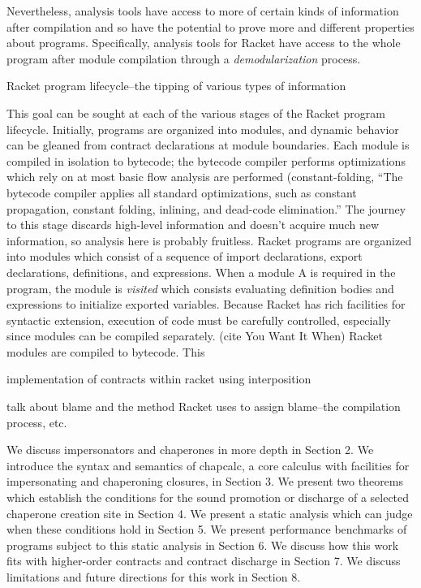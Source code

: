 \documentclass{sigplanconf}
\begin{document}
Nevertheless, analysis tools have access to more of certain kinds of information after compilation and so have the potential to prove more and different properties about programs.
Specifically, analysis tools for Racket have access to the whole program after module compilation through a \emph{demodularization} process.

Racket program lifecycle--the tipping of various types of information


This goal can be sought at each of the various stages of the Racket program lifecycle.
Initially, programs are organized into modules, and dynamic behavior can be gleaned from contract declarations at module boundaries.\cite{tobin2012higher}
Each module is compiled in isolation to bytecode; the bytecode compiler performs optimizations which rely on at most basic flow analysis are performed (constant-folding, 
``The bytecode compiler applies all standard optimizations, such as constant propagation, constant folding, inlining, and dead-code elimination.''
The journey to this stage discards high-level information and doesn't acquire much new information, so analysis here is probably fruitless.
Racket programs are organized into modules which consist of a sequence of import declarations, export declarations, definitions, and expressions.
When a module A is required in the program, the module is \emph{visited} which consists evaluating definition bodies and expressions to initialize exported variables.
Because Racket has rich facilities for syntactic extension, execution of code must be carefully controlled, especially since modules can be compiled separately.
(cite You Want It When)
Racket modules are compiled to bytecode. This

implementation of contracts within racket using interposition

talk about blame and the method Racket uses to assign blame--the compilation process, etc.

We discuss impersonators and chaperones in more depth in Section 2. We introduce the syntax and semantics of chapcalc, a core calculus with facilities for impersonating and chaperoning closures, in Section 3. We present two theorems which establish the conditions for the sound promotion or discharge of a selected chaperone creation site in Section 4. We present a static analysis which can judge when these conditions hold in Section 5. We present performance benchmarks of programs subject to this static analysis in Section 6. We discuss how this work fits with higher-order contracts and contract discharge in Section 7. We discuss limitations and future directions for this work in Section 8.
\end{document}
